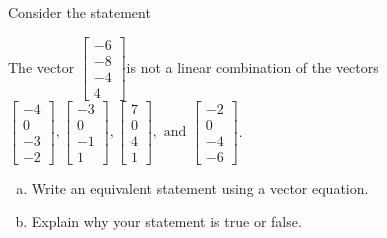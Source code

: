 
\begin{exerciseStatement}


Consider the statement 
\begin{center}\begin{minipage}{0.8\textwidth}
 The vector \( \left[\begin{array}{c}
-6 \\
-8 \\
-4 \\
4
\end{array}\right] \)is not a linear combination of the vectors \( \left[\begin{array}{c}
-4 \\
0 \\
-3 \\
-2
\end{array}\right] , \left[\begin{array}{c}
-3 \\
0 \\
-1 \\
1
\end{array}\right] , \left[\begin{array}{c}
7 \\
0 \\
4 \\
1
\end{array}\right] , \text{ and } \left[\begin{array}{c}
-2 \\
0 \\
-4 \\
-6
\end{array}\right] \). 
\end{minipage}\end{center}
    


\begin{enumerate}[(a)]
\item  Write an equivalent statement using a vector equation.
\item  Explain why your statement is true or false.
\end{enumerate}
    
\end{exerciseStatement}
    

